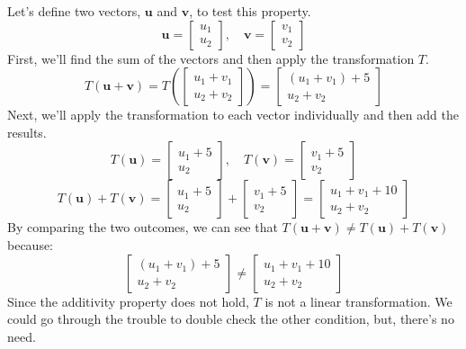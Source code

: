 \documentclass{article}
\begin{document}
                Let's define two vectors, $\mathbf{u}$ and $\mathbf{v}$, to test this property.
                \[
                    \mathbf{u} = \begin{bmatrix}u_1\\u_2\end{bmatrix}, \quad
                    \mathbf{v} = \begin{bmatrix}v_1\\v_2\end{bmatrix}
                \]
                First, we'll find the sum of the vectors and then apply the transformation $T$.
                \[
                    T(\mathbf{u}+\mathbf{v}) = T\left(\begin{bmatrix}u_1+v_1\\u_2+v_2\end{bmatrix}\right) = \begin{bmatrix}(u_1+v_1)+5\\u_2+v_2\end{bmatrix}
                \]
                Next, we'll apply the transformation to each vector individually and then add the results.
                \[
                    T(\mathbf{u}) = \begin{bmatrix}u_1+5\\u_2\end{bmatrix}, \quad
                    T(\mathbf{v}) = \begin{bmatrix}v_1+5\\v_2\end{bmatrix}
                \]
                \[
                    T(\mathbf{u}) + T(\mathbf{v}) = \begin{bmatrix}u_1+5\\u_2\end{bmatrix} + \begin{bmatrix}v_1+5\\v_2\end{bmatrix} = \begin{bmatrix}u_1+v_1+10\\u_2+v_2\end{bmatrix}
                \]
                By comparing the two outcomes, we can see that $T(\mathbf{u}+\mathbf{v}) \neq T(\mathbf{u}) + T(\mathbf{v})$ because:
                \[
                     \begin{bmatrix}(u_1+v_1)+5\\u_2+v_2\end{bmatrix} \neq \begin{bmatrix}u_1+v_1+10\\u_2+v_2\end{bmatrix}
                \]
                Since the additivity property does not hold, $T$ is not a linear transformation.
                We could go through the trouble to double check the other condition, but,
                there's no need.
\end{document}

